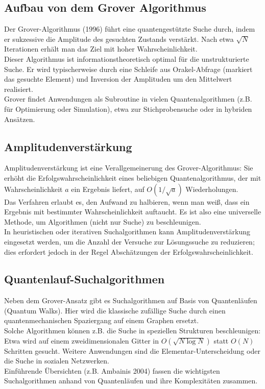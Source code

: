 \subsection{Aufbau von dem Grover Algorithmus}

Der Grover-Algorithmus (1996) führt eine quantengestützte Suche durch, indem er sukzessive die Amplitude des gesuchten Zustands verstärkt. Nach etwa $\sqrt{N}$ Iterationen erhält man das Ziel mit hoher Wahrscheinlichkeit.\\
Dieser Algorithmus ist informationstheoretisch optimal für die unstrukturierte Suche. Er wird typischerweise durch eine Schleife aus Orakel-Abfrage (markiert das gesuchte Element) und Inversion der Amplituden um den Mittelwert realisiert.\\
Grover findet Anwendungen als Subroutine in vielen Quantenalgorithmen (z.B. für Optimierung oder Simulation), etwa zur Stichprobensuche oder in hybriden Ansätzen.

\subsection{Amplitudenverstärkung}

Amplitudenverstärkung ist eine Verallgemeinerung des Grover-Algorithmus: Sie erhöht die Erfolgswahrscheinlichkeit eines beliebigen Quantenalgorithmus, der mit Wahrscheinlichkeit $a$ ein Ergebnis liefert, auf $O(1/\sqrt{a})$ Wiederholungen.\\
Das Verfahren erlaubt es, den Aufwand zu halbieren, wenn man weiß, dass ein Ergebnis mit bestimmter Wahrscheinlichkeit auftaucht. Es ist also eine universelle Methode, um Algorithmen (nicht nur Suche) zu beschleunigen.\\
In heuristischen oder iterativen Suchalgorithmen kann Amplitudenverstärkung eingesetzt werden, um die Anzahl der Versuche zur Lösungssuche zu reduzieren; dies erfordert jedoch in der Regel Abschätzungen der Erfolgswahrscheinlichkeit.

\subsection{Quantenlauf-Suchalgorithmen}

Neben dem Grover-Ansatz gibt es Suchalgorithmen auf Basis von Quantenläufen (Quantum Walks). Hier wird die klassische zufällige Suche durch einen quantenmechanischen Spaziergang auf einem Graphen ersetzt.\\
Solche Algorithmen können z.B. die Suche in speziellen Strukturen beschleunigen: Etwa wird auf einem zweidimensionalen Gitter in $O(\sqrt{N\log N})$ statt $O(N)$ Schritten gesucht. Weitere Anwendungen sind die Elementar-Unterscheidung oder die Suche in sozialen Netzwerken.\\
Einführende Übersichten (z.B. Ambainis 2004) fassen die wichtigsten Suchalgorithmen anhand von Quantenläufen und ihre Komplexitäten zusammen.

